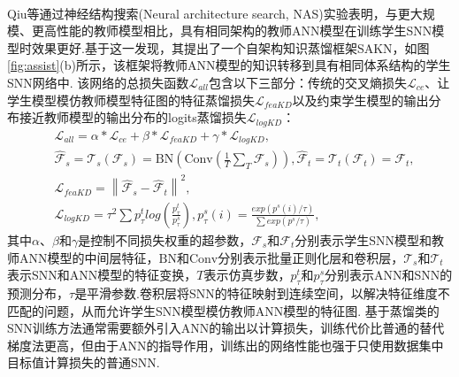 \documentclass[10.5pt,compsoc,UTF8]{CjC}
\theoremstyle{mystyle}
\newcommand{\upcite}[1]{\textsuperscript{\cite{#1}}}
\begin{document}
\begin{multicols}{1}
Qiu等\upcite{qiu2024self}通过神经结构搜索(Neural architecture search, NAS)实验表明，与更大规模、更高性能的教师模型相比，具有相同架构的教师ANN模型在训练学生SNN模型时效果更好.基于这一发现，其提出了一个自架构知识蒸馏框架SAKN，如图\ref{fig:assist}(b)所示，该框架将教师ANN模型的知识转移到具有相同体系结构的学生SNN网络中.
该网络的总损失函数$\mathcal{L}_{all}$包含以下三部分：传统的交叉熵损失$\mathcal{L}_{ce}$、让学生模型模仿教师模型特征图的特征蒸馏损失$\mathcal{L}_{feaKD}$以及约束学生模型的输出分布接近教师模型的输出分布的logits蒸馏损失$\mathcal{L}_{logKD}$：
\begin{align}
	&\mathcal{L}_{all}=\alpha*\mathcal{L}_{ce}+\beta*\mathcal{L}_{feaKD}+\gamma*\mathcal{L}_{logKD}, \\
	&\hat{\mathcal{F}}_s=\mathcal{T}_s(\mathcal{F}_s)=\text{BN}(\text{Conv}(\frac{1}{T}\sum_T{\mathcal{F}_s})), \hat{\mathcal{F}}_t=\mathcal{T}_t(\mathcal{F}_t)=\mathcal{F}_t, \\
	&\mathcal{L}_{feaKD}=\left\|\hat{\mathcal{F}}_s-\hat{\mathcal{F}}_t\right\|^2,\\
	&\mathcal{L}_{logKD}=\tau^2\sum{p_{\tau}^tlog(\frac{p^t_{\tau}}{p^s_{\tau}})}, p^s_{\tau}(i)=\frac{exp(p^s(i)/\tau)}{\sum exp(p^s/\tau)},
\end{align}
其中$\alpha$、$\beta$和$\gamma$是控制不同损失权重的超参数，$\mathcal{F}_s$和$\mathcal{F}_t$分别表示学生SNN模型和教师ANN模型的中间层特征，$\text{BN}$和$\text{Conv}$分别表示批量正则化层和卷积层，$\mathcal{T}_s$和$\mathcal{T}_t$表示SNN和ANN模型的特征变换，$T$表示仿真步数，$p^t_{\tau}$和$p^s_{\tau}$分别表示ANN和SNN的预测分布，$\tau$是平滑参数.卷积层将SNN的特征映射到连续空间，以解决特征维度不匹配的问题，从而允许学生SNN模型模仿教师ANN模型的特征图. 基于蒸馏类的SNN训练方法通常需要额外引入ANN的输出以计算损失，训练代价比普通的替代梯度法更高，但由于ANN的指导作用，训练出的网络性能也强于只使用数据集中目标值计算损失的普通SNN.







\end{multicols}
\end{document}
